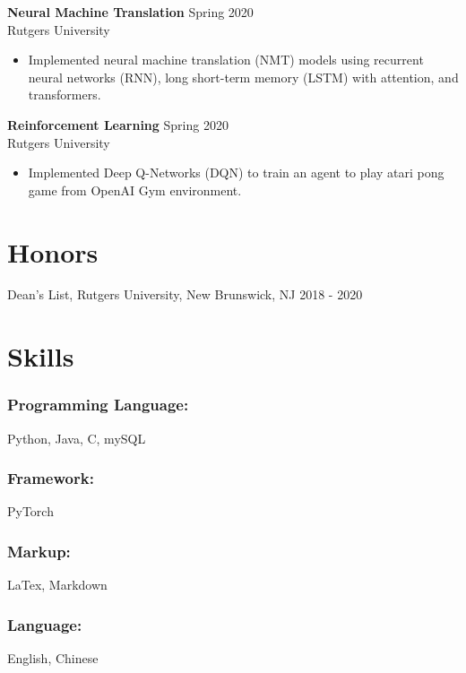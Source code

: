 \documentclass{article}
\begin{document}
\noindent \textbf{Neural Machine Translation}
\hfill{Spring 2020}\\
Rutgers University
\begin{itemize}
  \itemsep0em
  \item Implemented neural machine translation (NMT) models using recurrent neural networks (RNN), long short-term memory (LSTM) with attention, and transformers.
\end{itemize}

\noindent \textbf{Reinforcement Learning}
\hfill{Spring 2020}\\
Rutgers University
\begin{itemize}
  \itemsep0em
  \item Implemented Deep Q-Networks (DQN) to train an agent to play atari pong game from OpenAI Gym environment.
\end{itemize}


\section{Honors}
Dean's List, Rutgers University, New Brunswick, NJ
\hfill{2018 - 2020}\\


\section{Skills}

\subsubsection{Programming Language:}

Python, Java, C, mySQL

\subsubsection{Framework:}

PyTorch

\subsubsection{Markup:}

LaTex, Markdown

\subsubsection{Language:}
English, Chinese
\end{document}
